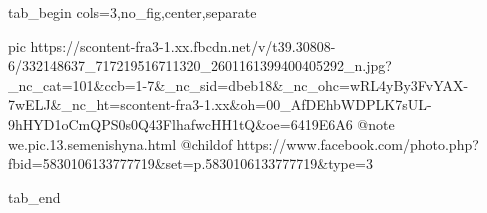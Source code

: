  
 
 
 
 


\ifcmt
  tab_begin cols=3,no_fig,center,separate

     pic https://scontent-fra3-1.xx.fbcdn.net/v/t39.30808-6/332148637_717219516711320_2601161399400405292_n.jpg?_nc_cat=101&ccb=1-7&_nc_sid=dbeb18&_nc_ohc=wRL4yBy3FvYAX-7wELJ&_nc_ht=scontent-fra3-1.xx&oh=00_AfDEhbWDPLK7sUL-9hHYD1oCmQPS0s0Q43FlhafwcHH1tQ&oe=6419E6A6
		 @note we.pic.13.semenishyna.html
		 @childof https://www.facebook.com/photo.php?fbid=5830106133777719&set=p.5830106133777719&type=3

  tab_end
\fi

